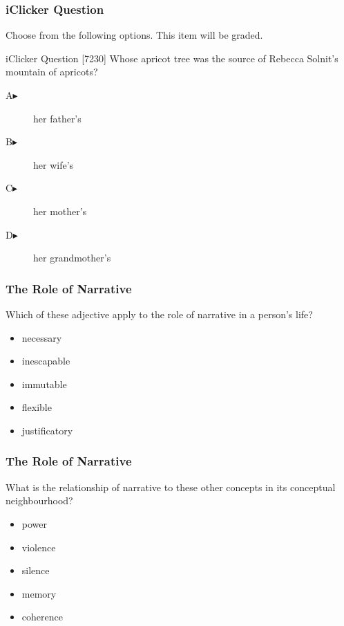 \documentclass[xcolor=dvipsnames]{beamer}
\begin{document}
\begin{frame}
  \frametitle{iClicker Question}
Choose from the following options. This item will be graded.
\begin{block}{iClicker Question}
[7230] Whose apricot tree was the source of Rebecca Solnit's mountain of apricots?
\end{block}
\begin{description}
\item[A\hspace{.2in}$\blacktriangleright$] her father's
\item[B\hspace{.2in}$\blacktriangleright$] her wife's
\item[C\hspace{.2in}$\blacktriangleright$] her mother's
\item[D\hspace{.2in}$\blacktriangleright$] her grandmother's
\end{description}
\end{frame}

\begin{frame}
  \frametitle{The Role of Narrative}
Which of these adjective apply to the role of narrative in a person's
life?
\begin{itemize}
\item necessary
\item inescapable
\item immutable
\item flexible
\item justificatory
\end{itemize}
\end{frame}

\begin{frame}
  \frametitle{The Role of Narrative}
What is the relationship of narrative to these other concepts in its
conceptual neighbourhood?
\begin{itemize}
\item power
\item violence
\item silence
\item memory
\item coherence
\end{itemize}
\end{frame}
\end{document}
